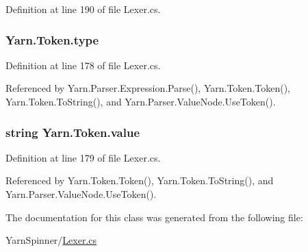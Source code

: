 Definition at line 190 of file Lexer.\-cs.

\hypertarget{a00175_a471a25da67fda0524f2375f9a882aafa}{
\subsubsection[{type}]{ Yarn.\-Token.\-type}}\label{a00175_a471a25da67fda0524f2375f9a882aafa}


Definition at line 178 of file Lexer.\-cs.



Referenced by Yarn.\-Parser.\-Expression.\-Parse(), Yarn.\-Token.\-Token(), Yarn.\-Token.\-To\-String(), and Yarn.\-Parser.\-Value\-Node.\-Use\-Token().

\hypertarget{a00175_a3df6b32d6190a639619a3f064c2154e2}{
\subsubsection[{value}]{\setlength{\rightskip}{0pt plus 5cm}string Yarn.\-Token.\-value}}\label{a00175_a3df6b32d6190a639619a3f064c2154e2}


Definition at line 179 of file Lexer.\-cs.



Referenced by Yarn.\-Token.\-Token(), Yarn.\-Token.\-To\-String(), and Yarn.\-Parser.\-Value\-Node.\-Use\-Token().



The documentation for this class was generated from the following file\-:\begin{DoxyCompactItemize}
\item 
Yarn\-Spinner/\hyperlink{a00313}{Lexer.\-cs}\end{DoxyCompactItemize}
